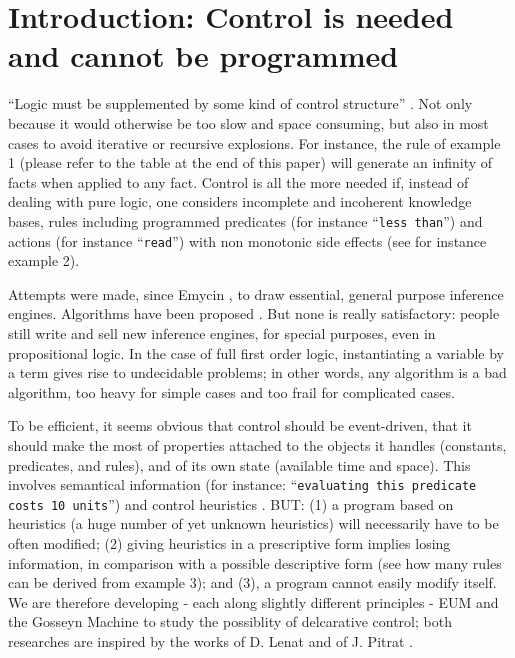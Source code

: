 \documentclass[11pt,a4paper,svgnames]{article}
\begin{document}
  \section{Introduction: Control is needed and cannot be programmed}
  \label{sec:intro}

  ``Logic must be supplemented by some kind of control structure''
  \cite{Simon-Search-1983}. Not only because it would otherwise be too slow and
  space consuming, but also in most cases to avoid iterative or recursive
  explosions. For instance, the rule of example 1 (please refer to the table at
  the end of this paper) will generate an infinity of facts when applied to any
  fact. Control is all the more needed if, instead of dealing with pure logic,
  one considers incomplete and incoherent knowledge bases, rules including
  programmed predicates (for instance ``\texttt{less than}'') and actions (for instance
  ``\texttt{read}'') with non monotonic side effects (see for instance example 2).

  Attempts were made, since Emycin \cite{VanMelle-Emycin-1980}, to draw
  essential, general purpose inference engines. Algorithms have been proposed
  \cite{Forgy-Rete-1982}. But none is really satisfactory: people still write
  and sell new inference engines, for special  purposes, even in propositional
  logic. In the case of full first order logic, instantiating a variable by a
  term gives rise to undecidable problems; in other words, any algorithm is a
  bad algorithm, too heavy for simple cases and too frail for complicated cases.

  To be efficient, it seems obvious that control should be event-driven, that it
  should make the most of properties attached to the objects it handles
  (constants, predicates, and rules), and of its own state (available time and
  space). This involves semantical information (for instance: ``\texttt{evaluating this
  predicate costs 10 units}'') and control heuristics \cite{Lenat-Heuristics-1982}.
  BUT: (1) a program based on heuristics (a huge
  number of yet unknown heuristics) will necessarily have to be often modified;
  (2) giving heuristics in a prescriptive form implies losing information, in
  comparison with a possible descriptive form (see how many rules can be derived
  from example 3); and (3), a program cannot easily modify itself. We are
  therefore developing - each along slightly different principles -
  EUM \cite{Starynkevitch-EUM-1986} and the Gosseyn
  Machine \cite{Fouet-CompRules-1987} to study the possiblity of delcarative
  control; both researches are inspired by the works of D. Lenat and of J.
  Pitrat \cite{Pitrat-Maciste-1985}.
\end{document}
